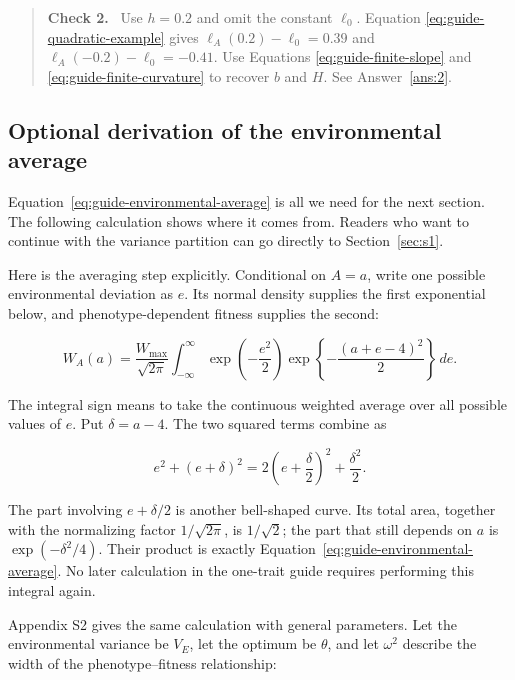 \documentclass[11pt]{article}
\newenvironment{checkpoint}[1]
  {\begin{quote}\small\noindent\textbf{Check #1.}\ }
  {\end{quote}}
\begin{document}
\begin{checkpoint}{2}
Use $h=0.2$ and omit the constant $\ell_0$.  Equation
\eqref{eq:guide-quadratic-example} gives $\ell_A(0.2)-\ell_0=0.39$ and
$\ell_A(-0.2)-\ell_0=-0.41$.  Use Equations
\eqref{eq:guide-finite-slope} and \eqref{eq:guide-finite-curvature} to recover
$b$ and $H$.  See Answer~\ref{ans:2}.
\end{checkpoint}

\subsection{Optional derivation of the environmental average}

Equation~\eqref{eq:guide-environmental-average} is all we need for the next section. The following calculation shows where it comes from. Readers who want to continue with the variance partition can go directly to Section~\ref{sec:s1}.

Here is the averaging step explicitly.  Conditional on $A=a$, write one
possible environmental deviation as $e$.  Its normal density supplies the
first exponential below, and phenotype-dependent fitness supplies the second:

\begin{equation}
W_A(a)=\frac{W_{\max}}{\sqrt{2\pi}}
\int_{-\infty}^{\infty}
\exp\left(-\frac{e^2}{2}\right)
\exp\left\{-\frac{(a+e-4)^2}{2}\right\}\,de.
\label{eq:guide-environmental-integral}
\end{equation}

The integral sign means to take the continuous weighted average over all
possible values of $e$.  Put $\delta=a-4$.  The two squared terms combine as

\begin{equation}
e^2+(e+\delta)^2=2\left(e+\frac \delta2\right)^2+\frac{\delta^2}{2}.
\end{equation}

The part involving $e+\delta/2$ is another bell-shaped curve.  Its total area,
together with the normalizing factor $1/\sqrt{2\pi}$, is $1/\sqrt2$; the part
that still depends on $a$ is $\exp(-\delta^2/4)$.  Their product is exactly
Equation~\eqref{eq:guide-environmental-average}.  No later calculation in the
one-trait guide requires performing this integral again.

Appendix S2 gives the same calculation with general parameters.  Let the
environmental variance be $V_E$, let the optimum be $\theta$, and let
$\omega^2$ describe the width of the phenotype--fitness relationship:
\end{document}
